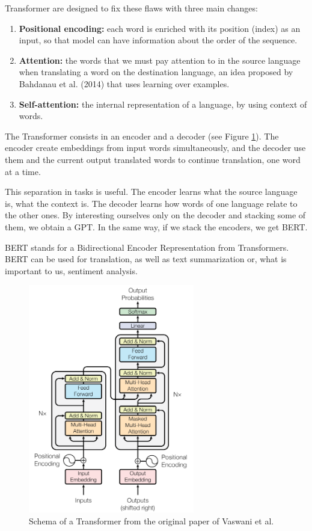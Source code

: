 \documentclass[11pt]{scrartcl}
\begin{document}
Transformer are designed to fix these flaws with three main changes:
\begin{enumerate}
    \item \textbf{Positional encoding:} each word is enriched with its position (index) as an input, so that model can have information about the order of the sequence.
    \item \textbf{Attention:} the words that we must pay attention to in the source language when translating a word on the destination language, an idea proposed by Bahdanau et al. (2014)\cite{bahdanau2014neural} that uses learning over examples.
    \item \textbf{Self-attention:} the internal representation of a language, by using context of words.
\end{enumerate}

The Transformer consists in an encoder and a decoder (see Figure \ref{fig:transformer}). The encoder create embeddings from input words simultaneously, and the decoder use them and the current output translated words to continue translation, one word at a time.

This separation in tasks is useful. The encoder learns what the source language is, what the context is. The decoder learns how words of one language relate to the other ones. By interesting ourselves only on the decoder and stacking some of them, we obtain a GPT. In the same way, if we stack the encoders, we get BERT.

BERT stands for a Bidirectional Encoder Representation from Transformers. BERT can be used for translation, as well as text summarization or, what is important to us, sentiment analysis. 

\begin{figure}[H]
    \centering
    \includegraphics[height=10cm]{img/Transformer.PNG}
    \caption{Schema of a Transformer from the original paper of Vaswani et al.\cite{vaswani2017attention}}
    \label{fig:transformer}
\end{figure}
\end{document}
